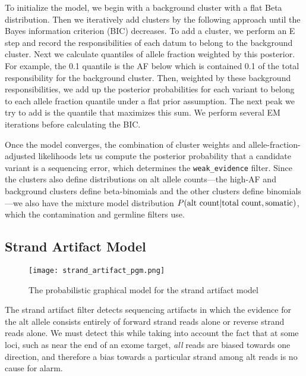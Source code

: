 \documentclass[nofootinbib,amssymb,amsmath]{revtex4}
\newcommand{\code}[1]{\texttt{#1}}
\begin{document}
To initialize the model, we begin with a background cluster with a flat Beta distribution.  Then we iteratively add clusters by the following approach until the Bayes information criterion (BIC) decreases.  To add a cluster, we perform an E step and record the responsibilities of each datum to belong to the background cluster.  Next we calculate quantiles of allele fraction weighted by this posterior.  For example, the 0.1 quantile is the AF below which is contained 0.1 of the total responsibility for the background cluster.  Then, weighted by these background responsibilities, we add up the posterior probabilities for each variant to belong to each allele fraction quantile under a flat prior assumption.  The next peak we try to add is the quantile that maximizes this sum.  We perform several EM iterations before calculating the BIC.

Once the model converges, the combination of cluster weights and allele-fraction-adjusted likelihoods lets us compute the posterior probability that a candidate variant is a sequencing error, which determines the \code{weak\_evidence} filter.  Since the clusters also define distributions on alt allele counts---the high-AF and background clusters define beta-binomials and the other clusters define binomials---we also have the mixture model distribution $P({\rm alt~count} | {\rm total~count}, {\rm somatic})$, which the contamination and germline filters use.


\subsection{Strand Artifact Model}

\begin{figure}
\centering
\texttt{[image: strand\_artifact\_pgm.png]}
\caption{\label{fig:strand artifact}The probabilistic graphical model for the strand artifact model}
\end{figure}

The strand artifact filter detects sequencing artifacts in which the evidence for the alt allele consists entirely of forward strand reads alone or reverse strand reads alone. We must detect this while taking into account the fact that at some loci, such as near the end of an exome target, \emph{all} reads are biased towards one direction, and therefore a bias towards a particular strand among alt reads is no cause for alarm.
\end{document}
